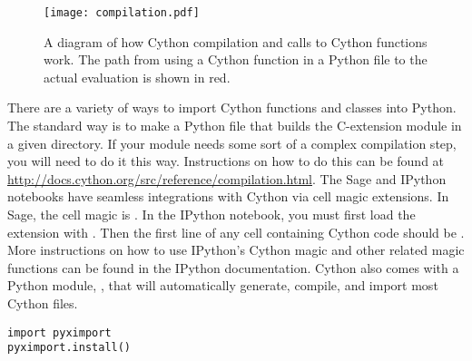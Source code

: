 \begin{figure}
\centering
\texttt{[image: compilation.pdf]}
\caption{A diagram of how Cython compilation and calls to Cython functions work.
The path from using a Cython function in a Python file to the actual evaluation is shown in red.}
\label{cython:compilation}
\end{figure}

There are a variety of ways to import Cython functions and classes into Python.
The standard way is to make a Python file that builds the C-extension module in a given directory.
If your module needs some sort of a complex compilation step, you will need to do it this way.
Instructions on how to do this can be found at \url{http://docs.cython.org/src/reference/compilation.html}.
The Sage and IPython notebooks have seamless integrations with Cython via cell magic extensions.
In Sage, the cell magic is .
In the IPython notebook, you must first load the extension with .
Then the first line of any cell containing Cython code should be .
More instructions on how to use IPython's Cython magic and other related magic functions can be found in the IPython documentation.
Cython also comes with a Python module, , that will automatically generate, compile, and import most Cython files.
\begin{lstlisting}
import pyximport
pyximport.install()
\end{lstlisting}

